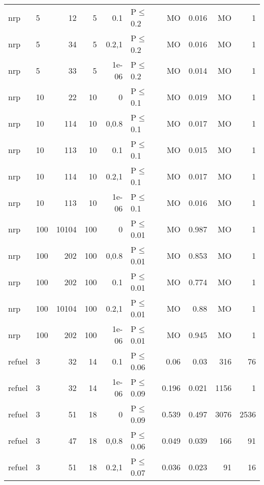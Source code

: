 \begin{longtable}{llrrrlrrrr}
 nrp           & 5        &     	12 &   5 & 0.1   & P$\leq$0.2   & MO      & 0.016    & MO     & 1      \\
 nrp           & 5        &     	34 &   5 & 0.2,1 & P$\leq$0.2   & MO      & 0.016    & MO     & 1      \\
 nrp           & 5        &     	33 &   5 & 1e-06 & P$\leq$0.2   & MO      & 0.014    & MO     & 1      \\
 nrp           & 10       &     	22 &  10 & 0     & P$\leq$0.1   & MO      & 0.019    & MO     & 1      \\
 nrp           & 10       &    	114 &  10 & 0,0.8 & P$\leq$0.1   & MO      & 0.017    & MO     & 1      \\
 nrp           & 10       &    	113 &  10 & 0.1   & P$\leq$0.1   & MO      & 0.015    & MO     & 1      \\
 nrp           & 10       &    	114 &  10 & 0.2,1 & P$\leq$0.1   & MO      & 0.017    & MO     & 1      \\
 nrp           & 10       &    	113 &  10 & 1e-06 & P$\leq$0.1   & MO      & 0.016    & MO     & 1      \\
 nrp           & 100      &  	10104 & 100 & 0     & P$\leq$0.01  & MO      & 0.987    & MO     & 1      \\
 nrp           & 100      &    	202 & 100 & 0,0.8 & P$\leq$0.01  & MO      & 0.853    & MO     & 1      \\
 nrp           & 100      &    	202 & 100 & 0.1   & P$\leq$0.01  & MO      & 0.774    & MO     & 1      \\
 nrp           & 100      &  	10104 & 100 & 0.2,1 & P$\leq$0.01  & MO      & 0.88     & MO     & 1      \\
 nrp           & 100      &    	202 & 100 & 1e-06 & P$\leq$0.01  & MO      & 0.945    & MO     & 1      \\
 refuel        & 3        &     	32 &  14 & 0.1   & P$\leq$0.06  & 0.06    & 0.03     & 316    & 76     \\
 refuel        & 3        &     	32 &  14 & 1e-06 & P$\leq$0.09  & 0.196   & 0.021    & 1156   & 1      \\
 refuel        & 3        &     	51 &  18 & 0     & P$\leq$0.09  & 0.539   & 0.497    & 3076   & 2536   \\
 refuel        & 3        &     	47 &  18 & 0,0.8 & P$\leq$0.06  & 0.049   & 0.039    & 166    & 91     \\
 refuel        & 3        &     	51 &  18 & 0.2,1 & P$\leq$0.07  & 0.036   & 0.023    & 91     & 16     \\
\bottomrule
\end{longtable}
